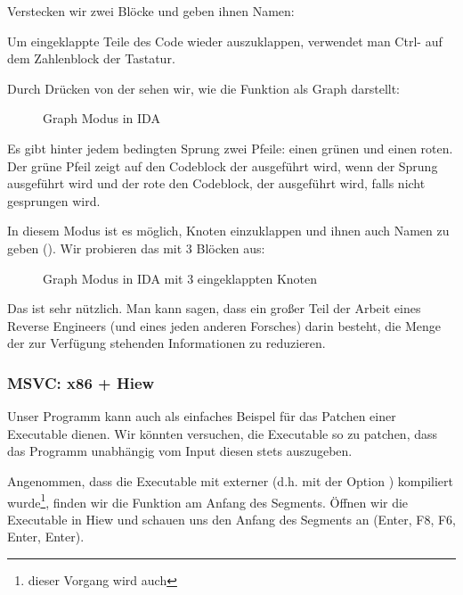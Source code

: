 Verstecken wir zwei Blöcke und geben ihnen Namen:



Um eingeklappte Teile des Code wieder auszuklappen, verwendet man Ctrl-\q{+} auf dem Zahlenblock der Tastatur.

\clearpage
Durch Drücken von der  sehen wir, wie \IDA die Funktion als Graph darstellt:

\begin{figure}[H]
\centering
{}
\caption{Graph Modus in IDA}
\label{fig:ex3_IDA_1}
\end{figure}
Es gibt hinter jedem bedingten Sprung zwei Pfeile: einen grünen und einen roten.
Der grüne Pfeil zeigt auf den Codeblock der ausgeführt wird, wenn der Sprung ausgeführt wird und der rote den Codeblock,
der ausgeführt wird, falls nicht gesprungen wird.

\clearpage
In diesem Modus ist es möglich, Knoten einzuklappen und ihnen auch Namen zu geben ().
Wir probieren das mit 3 Blöcken aus:

\begin{figure}[H]
\centering
{}
\caption{Graph Modus in IDA mit 3 eingeklappten Knoten}
\label{fig:ex3_IDA_2}
\end{figure}

Das ist sehr nützlich.
Man kann sagen, dass ein großer Teil der Arbeit eines Reverse Engineers (und eines jeden anderen Forsches) darin
besteht, die Menge der zur Verfügung stehenden Informationen zu reduzieren.



\clearpage
\subsubsection{MSVC: x86 + Hiew}
Unser Programm kann auch als einfaches Beispel für das Patchen einer Executable dienen.
Wir könnten versuchen, die Executable so zu patchen, dass das Programm unabhängig vom Input diesen stets auszugeben.

Angenommen, dass die Executable mit externer  (d.h. mit der Option ) kompiliert
wurde\footnote{dieser Vorgang wird auch }, finden wir die Funktion \main am Anfang des
 Segments. 
Öffnen wir die Executable in Hiew und schauen uns den Anfang des  Segments an (Enter, F8, F6, Enter, Enter).

